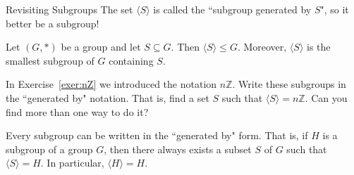 \begin{section}{Revisiting Subgroups}
The set \(\langle S\rangle\) is called the ``subgroup generated by \(S\)", so it better be a subgroup!

\begin{theorem}\label{thm:smallest_subgroup_containing_S}
Let \((G,*)\) be a group and let \(S\subseteq G\).  Then \(\langle S\rangle \leq G\).  Moreover, \(\langle S\rangle\) is the smallest subgroup of \(G\) containing \(S\).
\end{theorem}

\begin{exercise}
In Exercise~\ref{exer:nZ} we introduced the notation \(n\mathbb{Z}\).  Write these subgroups in the ``generated by" notation.  That is, find a set \(S\) such that \(\langle S\rangle =n\mathbb{Z}\).  Can you find more than one way to do it?
\end{exercise}

Every subgroup can be written in the ``generated by" form.  That is, if \(H\) is a subgroup of a group \(G\), then there always exists a subset \(S\) of \(G\) such that \(\langle S\rangle=H\).  In particular, \(\langle H\rangle=H\).


\end{section}
